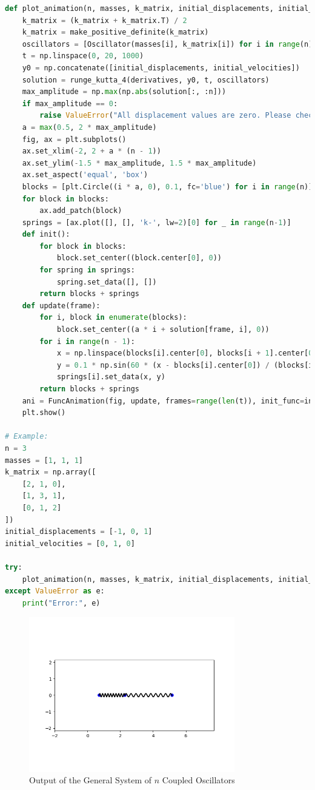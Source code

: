 \documentclass[a4paper,12pt]{article}
\begin{document}
\begin{lstlisting}[language=Python, caption=General system of $n$ coupled oscillators]
def plot_animation(n, masses, k_matrix, initial_displacements, initial_velocities):
    k_matrix = (k_matrix + k_matrix.T) / 2
    k_matrix = make_positive_definite(k_matrix)
    oscillators = [Oscillator(masses[i], k_matrix[i]) for i in range(n)]
    t = np.linspace(0, 20, 1000)
    y0 = np.concatenate([initial_displacements, initial_velocities])
    solution = runge_kutta_4(derivatives, y0, t, oscillators)
    max_amplitude = np.max(np.abs(solution[:, :n]))
    if max_amplitude == 0:
        raise ValueError("All displacement values are zero. Please check the input data.")
    a = max(0.5, 2 * max_amplitude)
    fig, ax = plt.subplots()
    ax.set_xlim(-2, 2 + a * (n - 1))
    ax.set_ylim(-1.5 * max_amplitude, 1.5 * max_amplitude)
    ax.set_aspect('equal', 'box')
    blocks = [plt.Circle((i * a, 0), 0.1, fc='blue') for i in range(n)]
    for block in blocks:
        ax.add_patch(block)
    springs = [ax.plot([], [], 'k-', lw=2)[0] for _ in range(n-1)]
    def init():
        for block in blocks:
            block.set_center((block.center[0], 0))
        for spring in springs:
            spring.set_data([], [])
        return blocks + springs
    def update(frame):
        for i, block in enumerate(blocks):
            block.set_center((a * i + solution[frame, i], 0))
        for i in range(n - 1):
            x = np.linspace(blocks[i].center[0], blocks[i + 1].center[0], 300)
            y = 0.1 * np.sin(60 * (x - blocks[i].center[0]) / (blocks[i + 1].center[0] - blocks[i].center[0]))
            springs[i].set_data(x, y)
        return blocks + springs
    ani = FuncAnimation(fig, update, frames=range(len(t)), init_func=init, blit=True, interval=10)
    plt.show()

# Example:
n = 3
masses = [1, 1, 1]
k_matrix = np.array([
    [2, 1, 0],
    [1, 3, 1],
    [0, 1, 2]
])
initial_displacements = [-1, 0, 1]
initial_velocities = [0, 1, 0]

try:
    plot_animation(n, masses, k_matrix, initial_displacements, initial_velocities)
except ValueError as e:
    print("Error:", e)
\end{lstlisting}

\begin{figure}[h!]
    \centering
    \includegraphics[width=0.8\textwidth]{figures/Figure_1.png}
    \caption{Output of the General System of $n$ Coupled Oscillators}
\end{figure}
\end{document}
